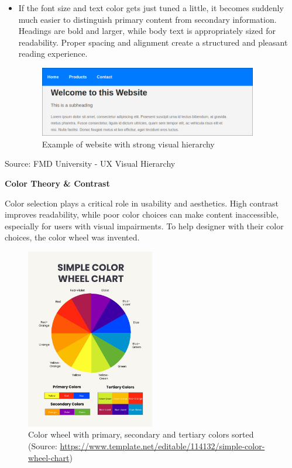 \blankLine
\begin{itemize}
    \item {
    If the font size and text color gets just tuned a little, it becomes suddenly much easier to distinguish primary content from secondary information. Headings are bold and larger, while body text is appropriately sized for readability. Proper spacing and alignment create a structured and pleasant reading experience.
    \begin{figure} [H]
        \center
        \includegraphics [width=0.9\textwidth] {images/paul/usabilityExamples/goodVisualHierarchy.png}
        \caption{Example of website with strong visual hierarchy}
    \end{figure}
    }
\end{itemize}Source: FMD University - UX Visual Hierarchy

\blankLine

\textbf{Color Theory \& Contrast}

Color selection plays a critical role in usability and aesthetics. High contrast improves readability, while poor color choices can make content inaccessible, especially for users with visual impairments. To help designer with their color choices, the color wheel was invented.  

\begin{figure} [H]
    \center
    \includegraphics [width=0.5\textwidth] {images/paul/colorWheel.jpg}
    \caption{Color wheel with primary, secondary and tertiary colors sorted (Source: \url{https://www.template.net/editable/114132/simple-color-wheel-chart})}
\end{figure}

